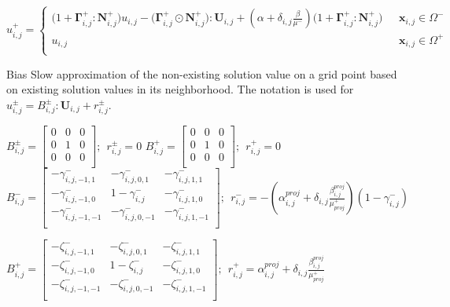 \documentclass{elsarticle}
\begin{document}
\begin{equation}
 u_{i,j}^+=\begin{cases}
    \big(1 + \boldsymbol{\Gamma}^+_{i,j} : \mathbf{N}^+_{i,j}\big) u_{i,j} - \big( \boldsymbol{ \Gamma}^+_{i,j} \odot  \mathbf{N}^+_{i,j}  \big) : \mathbf{U}_{i,j} + (\alpha + \delta_{i,j}\frac{\beta}{\mu^-})\big(1 + \boldsymbol{\Gamma}^+_{i,j} : \mathbf{N}^+_{i,j} \big)  & \text{ $\mathbf{x}_{i,j}\in \Omega^-$} \\
    u_{i,j} & \text{ $\mathbf{x}_{i,j}\in \Omega^+$}\\
  \end{cases}
\end{equation}



\begin{algorithm}
\caption{Bias Slow approximation of the non-existing solution value on a grid point based on existing solution values in its neighborhood. The notation is used for $u_{i,j}^\pm=B_{i,j}^\pm : \mathbf{U}_{i,j}+r_{i,j}^\pm$.}\label{euclid}
\begin{algorithmic}[1]
\State $B_{i,j}^\pm=\begin{bmatrix}
0 & 0 & 0 \\
0 & 1 & 0 \\
0 & 0 & 0 \\
\end{bmatrix};\ \ r^\pm_{i,j}=0$
\Else
{}
\State $B_{i,j}^+=\begin{bmatrix}
0 & 0 & 0 \\
0 & 1 & 0 \\
0 & 0 & 0 \\
\end{bmatrix};\ \ r^+_{i,j}=0$
\State $B_{i,j}^-=\begin{bmatrix}
-\gamma_{i,j,-1,1}^- & -\gamma_{i,j,0,1}^- & -\gamma_{i,j,1,1}^- \\
-\gamma_{i,j,-1,0}^- & 1-\gamma^-_{i,j} & -\gamma_{i,j,1,0}^- \\
-\gamma_{i,j,-1,-1}^- & -\gamma_{i,j,0,-1}^- & -\gamma_{i,j,1,-1}^- \\
\end{bmatrix};\ \ r^-_{i,j}=-(\alpha_{i,j}^{proj} + \delta_{i,j}\frac{ \beta_{i,j}^{proj}}{\mu_{proj}^+}) (1 - \gamma_{i,j}^-)$
\Else 

\State $B_{i,j}^+=\begin{bmatrix}
-\zeta_{i,j,-1,1}^- & -\zeta_{i,j,0,1}^- & -\zeta_{i,j,1,1}^- \\
-\zeta_{i,j,-1,0}^- & 1-\zeta^-_{i,j} & -\zeta_{i,j,1,0}^- \\
-\zeta_{i,j,-1,-1}^- & -\zeta_{i,j,0,-1}^- & -\zeta_{i,j,1,-1}^- \\
\end{bmatrix};\ \ r^+_{i,j}=\alpha_{i,j}^{proj} + \delta_{i,j}\frac{ \beta_{i,j}^{proj}}{\mu_{proj}^+}$


\end{algorithmic}
\end{algorithm}
\end{document}
